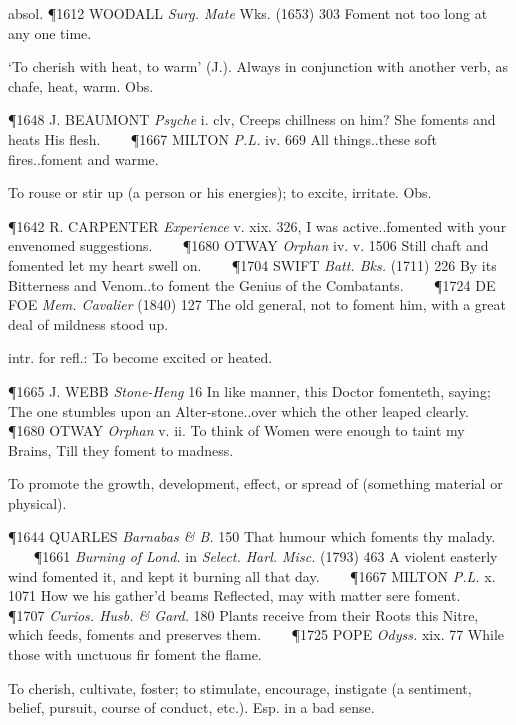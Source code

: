 \begin{description}[wide, labelwidth=!, labelindent=0pt]
\begin{myenumerate}
\indent absol. \P 1612 WOODALL  \textit{Surg. Mate} Wks. (1653) 303 Foment not too long at any one time.

 ‘To cherish with heat, to warm’ (J.). Always in conjunction with another verb, as chafe, heat, warm. Obs.

\P 1648 J. BEAUMONT  \textit{Psyche} i. clv, Creeps chillness on him? She foments and heats His flesh.    
\P 1667 MILTON  \textit{P.L.} iv. 669 All things..these soft fires..foment and warme.

 To rouse or stir up (a person or his energies); to excite, irritate. Obs.

\P 1642 R. CARPENTER  \textit{Experience} v. xix. 326, I was active..fomented with your envenomed suggestions.    
\P 1680 OTWAY  \textit{Orphan} iv. v. 1506 Still  chaft and fomented let my heart swell on.    
\P 1704 SWIFT  \textit{Batt. Bks.} (1711) 226 By its Bitterness and Venom..to foment the Genius of the Combatants.    
\P 1724 DE FOE  \textit{Mem. Cavalier} (1840) 127 The old general, not to foment him, with a great deal of mildness stood up.

 intr. for refl.: To become excited or heated.

\P 1665 J. WEBB  \textit{Stone-Heng} 16 In like manner, this Doctor fomenteth, saying; The one stumbles upon an Alter-stone..over which the other leaped clearly.    
\P 1680 OTWAY  \textit{Orphan} v. ii. To think  of Women were enough to taint my Brains, Till they foment to madness.

 To promote the growth, development, effect, or spread of (something material or physical).

\P 1644 QUARLES  \textit{Barnabas \& B.} 150 That humour which foments thy malady.    
\P 1661 \textit{Burning  of Lond.} in \textit{Select. Harl. Misc.} (1793) 463 A violent easterly wind fomented it, and kept it burning all that day.    
\P 1667 MILTON  \textit{P.L.} x. 1071 How  we his gather'd beams Reflected, may with matter sere foment.    
\P 1707 \textit{Curios.  Husb. \& Gard.} 180 Plants receive from their Roots this Nitre, which feeds, foments and preserves them.    
\P 1725 POPE  \textit{Odyss.} xix. 77 While those with unctuous fir foment the flame.

 To cherish, cultivate, foster; to stimulate, encourage, instigate (a sentiment, belief, pursuit, course of conduct, etc.). Esp. in a bad sense.


\end{myenumerate}
\end{description}
